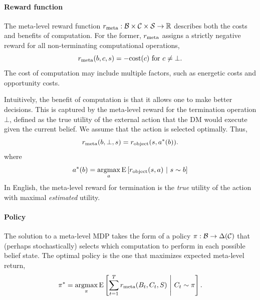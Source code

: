 \paragraph{Reward function}
The meta-level reward function $r_{\text{meta}}: \mathcal{B} \times \mathcal{C} \times \mathcal{S} \rightarrow \mathbb{R}$ describes both the costs and benefits of computation. For the former, $r_{\text{meta}}$ assigns a strictly negative reward for all non-terminating computational operations,
%
\begin{equation}
r_{\text{meta}}(b, c, s) = -\text{cost}(c) \text{ for } c \neq \bot.
\end{equation}
%
The cost of computation may include multiple factors, such as energetic costs and opportunity costs. 

Intuitively, the benefit of computation is that it allows one to make better decisions. This is captured by the meta-level reward for the termination operation $\bot$, defined as the true utility of the external action that the DM would execute given the current belief. We assume that the action is selected optimally. Thus,
%
\begin{equation}\label{eq:term-reward}
r_{\text{meta}}(b, \bot, s) = r_{\text{object}}(s, a^*(b)).
\end{equation}
%
where
%
\begin{equation}\label{eq:object-action}
a^*(b) = \operatorname*{argmax}_a \operatorname*{E} \left[ r_{\text{object}}(s, a) \ \middle\vert\ s \sim b \right]
\end{equation}
%
In English, the meta-level reward for termination is the \emph{true} utility of the action\footnotemark{} with maximal \emph{estimated} utility.


\paragraph{Policy}\label{sec:metamdp-policy}

The solution to a meta-level MDP takes the form of a policy $\pi: \mathcal{B} \rightarrow \Delta(\mathcal{C})$ that (perhaps stochastically) selects which computation to perform in each possible belief state. The optimal policy is the one that maximizes expected meta-level return,
%
\begin{equation}\label{eq:optimal-policy}
  \pi^* = \operatorname*{argmax}_\pi \operatorname*{E} \left[ 
    \sum_{t=1}^T r_{\text{meta}}(B_t, C_t, S)
   \ \middle\vert\ 
    C_t \sim \pi
   \right].
\end{equation}


